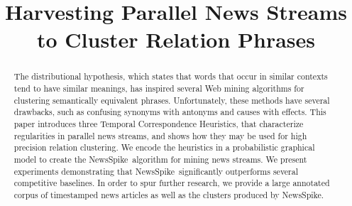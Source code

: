 \documentclass[11pt]{article}
\title{Harvesting Parallel News Streams to Cluster Relation Phrases}
\newcommand{\sys}{\mbox{\sc NewsSpike}}   %
\begin{document}
\maketitle

\begin{abstract}
The distributional hypothesis, which states that words that occur in
similar contexts tend to have similar meanings, has inspired several
Web mining algorithms for clustering semantically equivalent phrases.
Unfortunately, these methods have several drawbacks, such as confusing
synonyms with antonyms and causes with effects. This paper introduces
three Temporal Correspondence Heuristics, that characterize
regularities in parallel news streams, and shows how they may be used
for high precision relation clustering. We encode the heuristics in a
probabilistic graphical model to create the \sys\ algorithm for mining
news streams. We present experiments demonstrating that
\sys\ significantly outperforms several competitive baselines.  In
order to spur further research, we provide a large annotated corpus of
timestamped news articles as well as the clusters produced by \sys.
\end{abstract}







%

%
%




%



\end{document}
